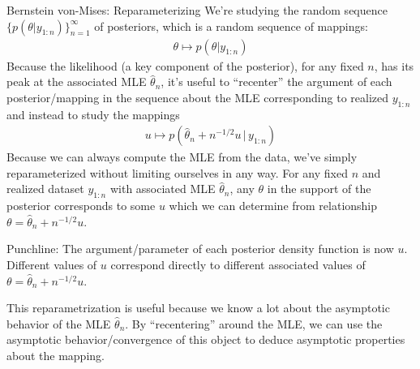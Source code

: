 \documentclass[aspectratio=169, handout]{beamer}
\begin{document}
{\scriptsize
\begin{frame}{Bernstein von-Mises: Reparameterizing}
We're studying the random sequence $\{p(\theta|y_{1:n})\}_{n=1}^\infty$
of posteriors, which is a random sequence of mappings:
\begin{align*}
  \theta\mapsto
  p(\theta|y_{1:n})
\end{align*}
Because the likelihood (a key component of the posterior),
for any fixed $n$, has its peak at the associated MLE
$\hat{\theta}_n$, it's useful to ``\alert{recenter}'' the argument of
each posterior/mapping in the sequence about the MLE corresponding to
realized $y_{1:n}$ and instead to study the mappings
\begin{align*}
  u
  \mapsto
  p(\hat{\theta}_n+n^{-1/2}u\,|\,y_{1:n})
\end{align*}
Because we can always compute the MLE from the data, we've
simply \alert{reparameterized} without limiting ourselves in any way.
For any fixed $n$ and realized dataset $y_{1:n}$ with associated MLE
$\hat{\theta}_n$, any $\theta$ in the support of the posterior
corresponds to some $u$ which we can determine from relationship
$\theta=\hat{\theta}_n+n^{-1/2}u$.

\alert{Punchline}:
The argument/parameter of each posterior density function is now $u$.
Different values of $u$ correspond directly to different associated
values of $\theta=\hat{\theta}_n+n^{-1/2}u$.

This reparametrization is useful because we know a lot about the
asymptotic behavior of the MLE $\hat{\theta}_n$.
By ``recentering'' around the MLE, we can use the
asymptotic behavior/convergence of this object to deduce asymptotic
properties about the mapping.
\end{frame}
}
\end{document}
